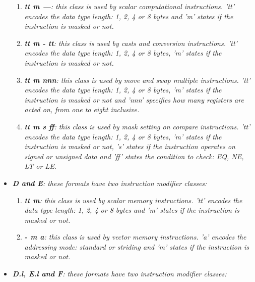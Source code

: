\begin{itemize}
\begin{enumerate}
                        \item \textit{\textbf{tt m ---}: this class is used by scalar computational instructions. 'tt' encodes the data type length: 1, 2, 4 or 8 bytes and 'm' states if the instruction is masked or not.}

                        \item \textit{\textbf{tt m - tt}: this class is used by casts and conversion instructions. 'tt' encodes the data type length: 1, 2, 4 or 8 bytes, 'm' states if the instruction is masked or not.}

                        \item \textit{\textbf{tt m nnn}: this class is used by move and swap multiple instructions. 'tt' encodes the data type length: 1, 2, 4 or 8 bytes, 'm' states if the instruction is masked or not and 'nnn' specifies how many registers are acted on, from one to eight inclusive.}

                        \item \textit{\textbf{tt m s ff}: this class is used by mask setting on compare instructions. 'tt' encodes the data type length: 1, 2, 4 or 8 bytes, 'm' states if the instruction is masked or not, 's' states if the instruction operates on signed or unsigned data and 'ff' states the condition to check: EQ, NE, LT or LE.}

                    \end{enumerate}

                \item \textit{\textbf{D and E}: these formats have two instruction modifier classes:}

                    \begin{enumerate}

                        \item \textit{\textbf{tt m}: this class is used by scalar memory instructions. 'tt' encodes the data type length: 1, 2, 4 or 8 bytes and 'm' states if the instruction is masked or not.}

                        \item \textit{\textbf{- m a}: this class is used by vector memory instructions. 'a' encodes the addressing mode: standard or striding and 'm' states if the instruction is masked or not.}

                    \end{enumerate}

                \item \textit{\textbf{D.l, E.l and F}: these formats have two instruction modifier classes:}


\end{itemize}

